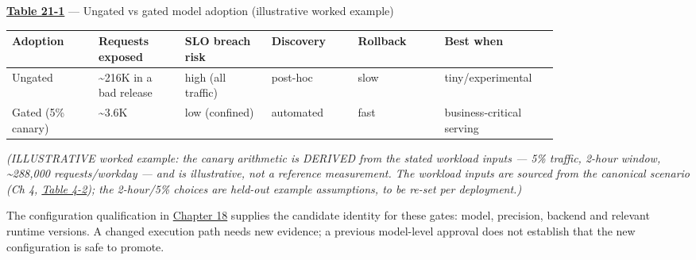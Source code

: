 \textbf{\hyperref[tab:21.1]{Table 21-1}} --- Ungated vs gated model adoption (illustrative
worked example)

\nopagebreak[4]
\begin{longtable}[]{@{}
  >{\raggedright\arraybackslash}p{0.1327\linewidth}
  >{\raggedright\arraybackslash}p{0.1327\linewidth}
  >{\raggedright\arraybackslash}p{0.1327\linewidth}
  >{\raggedright\arraybackslash}p{0.1327\linewidth}
  >{\raggedright\arraybackslash}p{0.1327\linewidth}
  >{\raggedright\arraybackslash}p{0.1327\linewidth}@{}}
\toprule\noalign{}
\begin{minipage}[b]{\linewidth}\raggedright
Adoption
\end{minipage} & \begin{minipage}[b]{\linewidth}\raggedright
Requests exposed
\end{minipage} & \begin{minipage}[b]{\linewidth}\raggedright
SLO breach risk
\end{minipage} & \begin{minipage}[b]{\linewidth}\raggedright
Discovery
\end{minipage} & \begin{minipage}[b]{\linewidth}\raggedright
Rollback
\end{minipage} & \begin{minipage}[b]{\linewidth}\raggedright
Best when
\end{minipage} \\
\midrule\noalign{}
\endhead
\bottomrule\noalign{}
\endlastfoot
Ungated & \textasciitilde216K in a bad release & high (all traffic) &
post-hoc & slow & tiny/experimental \\
\noalign{\label{tab:21.1}}
Gated (5\% canary) & \textasciitilde3.6K & low (confined) & automated &
fast & business-critical serving \\
\end{longtable}

\emph{(ILLUSTRATIVE worked example: the canary arithmetic is DERIVED
from the stated workload inputs --- 5\% traffic, 2-hour window,
\textasciitilde288,000 requests/workday --- and is illustrative, not a
reference measurement. The workload inputs are sourced from the
canonical scenario (Ch 4, \hyperref[tab:4.2]{Table 4-2}); the 2-hour/5\% choices are
held-out example assumptions, to be re-set per deployment.)}

\label{measurement}


The configuration qualification in \hyperref[chap:18]{Chapter 18} supplies the candidate
identity for these gates: model, precision, backend and relevant runtime
versions. A changed execution path needs new evidence; a previous
model-level approval does not establish that the new configuration is
safe to promote.

